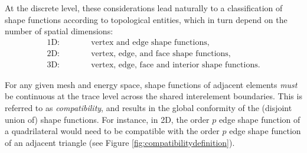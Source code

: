 At the discrete level, these considerations lead naturally to a classification of shape functions according to topological entities, which in turn depend on the number of spatial dimensions:
\begin{equation*}
	\begin{aligned}
		\text{1D:}&\quad\qquad\text{vertex and edge shape functions,}\\
		\text{2D:}&\quad\qquad\text{vertex, edge, and face shape functions,}\\
		\text{3D:}&\quad\qquad\text{vertex, edge, face and interior shape functions.}
	\end{aligned}
\end{equation*}

For any given mesh and energy space, shape functions of adjacent elements \textit{must} be continuous at the trace level across the shared interelement boundaries.
This is referred to as \textit{compatibility}, and results in the global conformity of the (disjoint union of) shape functions. 
For instance, in 2D, the order $p$ edge shape function of a quadrilateral would need to be compatible with the order $p$ edge shape function of an adjacent triangle (see Figure \ref{fig:compatibilitydefinition}).

